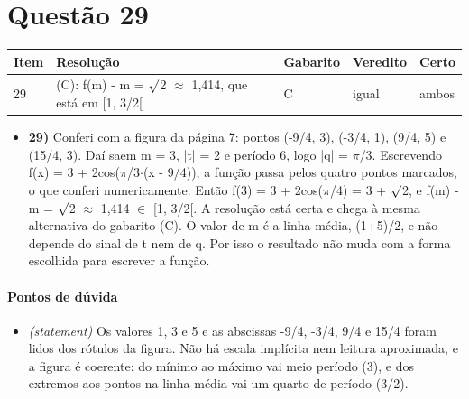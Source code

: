 \documentclass{article}%
\begin{document}
\section*{Questão 29}%
\begin{longtable}{@{}p{} p{} p{} p{} p{}@{}}\toprule Item & Resolução & Gabarito & Veredito & Certo \\ \midrule
29 & (C): f(m) - m = $\surd$2 $\approx$ 1,414, que está em {[}1, 3/2{[} & C & igual & ambos \\
\bottomrule\end{longtable}%
\begin{itemize}%
\item%
\textbf{29)} Conferi com a figura da página 7: pontos (-9/4, 3), (-3/4, 1), (9/4, 5) e (15/4, 3). Daí saem m = 3, |t| = 2 e período 6, logo |q| = $\pi$/3. Escrevendo f(x) = 3 + 2cos($\pi$/3$\cdot$(x - 9/4)), a função passa pelos quatro pontos marcados, o que conferi numericamente. Então f(3) = 3 + 2cos($\pi$/4) = 3 + $\surd$2, e f(m) - m = $\surd$2 $\approx$ 1,414 $\in$ {[}1, 3/2{[}. A resolução está certa e chega à mesma alternativa do gabarito (C). O valor de m é a linha média, (1+5)/2, e não depende do sinal de t nem de q. Por isso o resultado não muda com a forma escolhida para escrever a função.%
\end{itemize}%
\paragraph{Pontos de dúvida}%
\begin{itemize}%
\item%
\textit{(statement)} Os valores 1, 3 e 5 e as abscissas -9/4, -3/4, 9/4 e 15/4 foram lidos dos rótulos da figura. Não há escala implícita nem leitura aproximada, e a figura é coerente: do mínimo ao máximo vai meio período (3), e dos extremos aos pontos na linha média vai um quarto de período (3/2).%
\end{itemize}%
\end{document}
